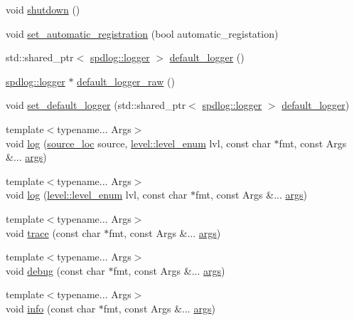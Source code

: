 \begin{DoxyCompactItemize}
void \hyperlink{namespacespdlog_a38b5c05a859763c5e350e8ec3da9e328}{shutdown} ()
\item 
void \hyperlink{namespacespdlog_a95b9f066c4e8ad65454049bdd7f6b956}{set\+\_\+automatic\+\_\+registration} (bool automatic\+\_\+registation)
\item 
std\+::shared\+\_\+ptr$<$ \hyperlink{classspdlog_1_1logger}{spdlog\+::logger} $>$ \hyperlink{namespacespdlog_a9e6a16853c325306188a7f6f642eba94}{default\+\_\+logger} ()
\item 
\hyperlink{classspdlog_1_1logger}{spdlog\+::logger} $\ast$ \hyperlink{namespacespdlog_a2c623c9fadba3efc09b48dac8a3990be}{default\+\_\+logger\+\_\+raw} ()
\item 
void \hyperlink{namespacespdlog_ab8a13bd805e706298e1e396ee5ac93bb}{set\+\_\+default\+\_\+logger} (std\+::shared\+\_\+ptr$<$ \hyperlink{classspdlog_1_1logger}{spdlog\+::logger} $>$ \hyperlink{namespacespdlog_a9e6a16853c325306188a7f6f642eba94}{default\+\_\+logger})
\item 
{\footnotesize template$<$typename... Args$>$ }\\void \hyperlink{namespacespdlog_acc4ad5305b408c41a60540b0e2a8aa85}{log} (\hyperlink{structspdlog_1_1source__loc}{source\+\_\+loc} source, \hyperlink{namespacespdlog_1_1level_a35f5227e5daf228d28a207b7b2aefc8b}{level\+::level\+\_\+enum} lvl, const char $\ast$fmt, const Args \&... \hyperlink{printf_8h_a47047b7b28fd1342eef756b79c778580}{args})
\item 
{\footnotesize template$<$typename... Args$>$ }\\void \hyperlink{namespacespdlog_a7ad1ad069c196a042cb191b05d27167a}{log} (\hyperlink{namespacespdlog_1_1level_a35f5227e5daf228d28a207b7b2aefc8b}{level\+::level\+\_\+enum} lvl, const char $\ast$fmt, const Args \&... \hyperlink{printf_8h_a47047b7b28fd1342eef756b79c778580}{args})
\item 
{\footnotesize template$<$typename... Args$>$ }\\void \hyperlink{namespacespdlog_a0ec6777ea7982bcf7cf85b87b0619b56}{trace} (const char $\ast$fmt, const Args \&... \hyperlink{printf_8h_a47047b7b28fd1342eef756b79c778580}{args})
\item 
{\footnotesize template$<$typename... Args$>$ }\\void \hyperlink{namespacespdlog_a29e62b80052a1440e526853d4b2c3c5c}{debug} (const char $\ast$fmt, const Args \&... \hyperlink{printf_8h_a47047b7b28fd1342eef756b79c778580}{args})
\item 
{\footnotesize template$<$typename... Args$>$ }\\void \hyperlink{namespacespdlog_a3ee2e37859d2eee2722afc8ac26319ae}{info} (const char $\ast$fmt, const Args \&... \hyperlink{printf_8h_a47047b7b28fd1342eef756b79c778580}{args})

\end{DoxyCompactItemize}
